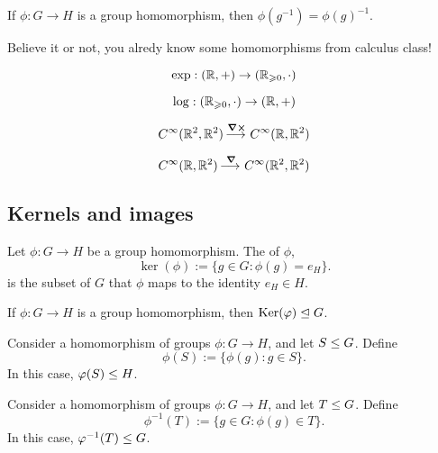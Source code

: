 \documentclass{ximera}
\begin{document}
\begin{lemma}\label{L:HPI}
  If $\phi:G\to H$ is a group homomorphism, then $\phi(g^{-1}) =
  \phi(g)^{-1}$.
\end{lemma}




Believe it or not, you alredy know some homomorphisms from calculus
class!

\[
\exp:(\mathbb R,+) \to (\mathbb R_{\geqslant 0},\cdot)
\]

\[
\log:(\mathbb R_{\geqslant 0},\cdot) \to (\mathbb R,+)
\]

\[
C^\infty(\mathbb R^2,\mathbb R^2) \mathop{\longrightarrow\,}\limits^{\boldsymbol{\nabla\times}} C^\infty(\mathbb R,\mathbb R^2)
\]


\[
C^\infty(\mathbb R,\mathbb R^2) \mathop{\longrightarrow\,}\limits^{\boldsymbol\nabla} C^\infty(\mathbb R^2,\mathbb R^2)
\]








\subsection{Kernels and images}



\begin{definition}
  Let $\phi:G\to H$ be a group homomorphism. The  of
  $\phi$,
  \[
  \ker(\phi) := \{g\in G: \phi(g) = e_H\}.
  \]
  is the subset of $G$ that $\phi$ maps to the identity $e_H\in H$.
\end{definition}


\begin{lemma}\label{L:kerN}
  If $\phi:G\to H$ is a group homomorphism, then $\mathop{\mathrm{Ker}}\nolimits(\varphi)\trianglelefteq G$.
\end{lemma}

\begin{lemma}\label{L:hps}
  Consider a homomorphism of groups $\phi:G\to H$, and let $S\leq
  G$. Define
  \[
  \phi(S) := \{\phi(g): g\in S\}.
  \]
  In this case, $\varphi(S) \leq H$.
\end{lemma}



\begin{lemma}\label{L:pps}
  Consider a homomorphism of groups $\phi:G\to H$, and let $T\leq
  G$. Define
  \[
  \phi^{-1}(T) := \{g\in G: \phi(g)\in T\}.
  \]
  In this case, $\varphi^{-1}(T) \leq G$.
\end{lemma}
\end{document}

